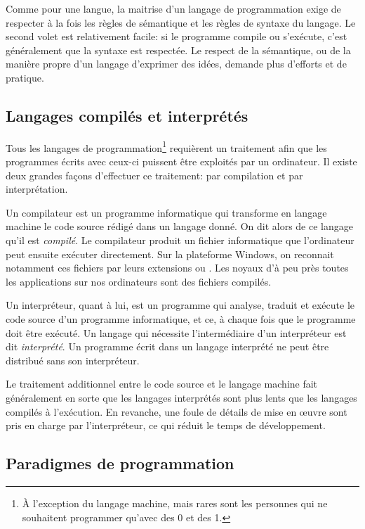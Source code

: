 Comme pour une langue, la maitrise d'un langage de programmation exige
de respecter à la fois les règles de sémantique et les règles de
syntaxe du langage. Le second volet est relativement facile: si le
programme compile ou s'exécute, c'est généralement que la syntaxe est
respectée. Le respect de la sémantique, ou de la manière propre d'un
langage d'exprimer des idées, demande plus d'efforts et de pratique.


\subsection{Langages compilés et interprétés}
\label{sec:informatique:concepts:compile_vs_interprete}

Tous les langages de programmation\footnote{%
  À l'exception du langage machine, mais rares sont les personnes qui
  ne souhaitent programmer qu'avec des 0 et des 1.} %
requièrent un traitement afin que les programmes écrits avec ceux-ci
puissent être exploités par un ordinateur. Il existe deux grandes
façons d'effectuer ce traitement: par compilation et par
interprétation.

Un compilateur est un programme informatique qui
transforme en langage machine le code source rédigé dans un langage
donné. On dit alors de ce langage qu'il est %
\emph{compilé}. Le compilateur produit un
fichier informatique que l'ordinateur peut ensuite exécuter
directement. Sur la plateforme Windows, on reconnait notamment ces
fichiers par leurs extensions  ou . Les noyaux
d'à peu près toutes les applications sur nos ordinateurs sont des
fichiers compilés.

Un interpréteur, quant à lui, est un programme qui
analyse, traduit et exécute le code source d'un programme
informatique, et ce, à chaque fois que le programme doit être exécuté.
Un langage qui nécessite l'intermédiaire d'un interpréteur est dit
\emph{interprété}. Un programme écrit dans un %
langage interprété ne peut être distribué
sans son interpréteur.

Le traitement additionnel entre le code source et le langage machine
fait généralement en sorte que les langages interprétés sont plus
lents que les langages compilés à l'exécution. En revanche, une foule
de détails de mise en œuvre sont pris en charge par l'interpréteur, ce
qui réduit le temps de développement.


\subsection{Paradigmes de programmation}
\label{sec:informatique:concepts:paradigmes}

